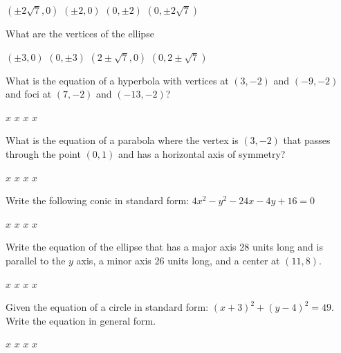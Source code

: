 \documentclass{exam}
\begin{document}
\begin{questions}
\begin{oneparchoices}
	\choice $(\pm 2\sqrt7,0)$
	\choice $(\pm 2,0)$
	\choice $(0, \pm 2)$
	\choice $(0, \pm 2\sqrt7)$
\end{oneparchoices} \answerline

\question  What are the vertices of the ellipse 

\begin{oneparchoices}
	\choice $(\pm 3,0)$
	\choice $(0,\pm3)$
	\choice $(2 \pm \sqrt7, 0)$
	\choice $(0, 2 \pm \sqrt7)$
\end{oneparchoices} \answerline

\question What is the equation of a hyperbola with vertices at $(3,-2)$ and $(-9,-2)$ and foci at $(7,-2)$ and $(-13,-2)$?

\begin{oneparchoices}
	\choice $x$
	\choice $x$
	\choice $x$
	\choice $x$
\end{oneparchoices} \answerline

\question What is the equation of a parabola where the vertex is $(3, -2)$ that passes through the point
 $(0, 1)$ and has a horizontal axis of symmetry?

 \begin{oneparchoices}
	\choice $x$
	\choice $x$
	\choice $x$
	\choice $x$
\end{oneparchoices} \answerline

\question Write the following conic in standard form: $4x^2 - y^2 - 24x - 4y + 16 = 0$

\begin{oneparchoices}
	\choice $x$
	\choice $x$
	\choice $x$
	\choice $x$
\end{oneparchoices} \answerline

\question Write the equation of the ellipse that has a major axis 28 units long and is parallel to the $y$ axis,
 a minor axis 26 units long, and a center at $(11, 8)$.

\begin{oneparchoices}
	\choice $x$
	\choice $x$
	\choice $x$
	\choice $x$
\end{oneparchoices} \answerline

\question Given the equation of a circle in standard form: $(x + 3)^2 + (y - 4)^2 = 49$. Write the equation in general form.

\begin{oneparchoices}
	\choice $x$
	\choice $x$
	\choice $x$
	\choice $x$
\end{oneparchoices} \answerline


\end{questions}
\end{document}
